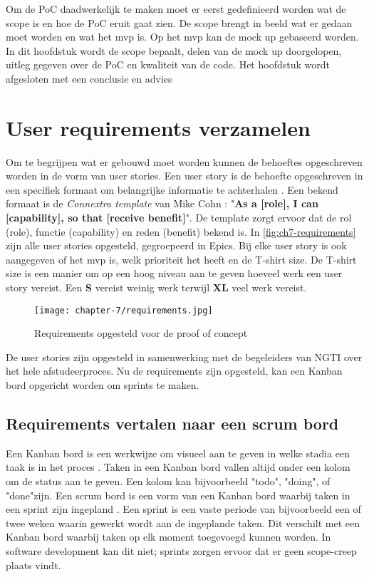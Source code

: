 Om de PoC daadwerkelijk te maken moet er eerst gedefinieerd worden wat de scope is en hoe de PoC eruit gaat zien. De scope brengt in beeld wat er gedaan moet worden en wat het \acrfull{mvp} is. Op het \acrshort{mvp} kan de mock up gebaseerd worden. In dit hoofdstuk wordt de scope bepaalt, delen van de mock up doorgelopen, uitleg gegeven over de PoC en kwaliteit van de code. Het hoofdstuk wordt afgesloten met een conclusie en advies

\section{User requirements verzamelen}\label{sec:ch7-user-requirements-verzamelen}
Om te begrijpen wat er gebouwd moet worden kunnen de behoeftes opgeschreven worden in de vorm van user stories. Een user story is de behoefte opgeschreven in een specifiek formaat om belangrijke informatie te achterhalen \cite{agile-user-story-template}. Een bekend formaat is de \textit{Connextra template} van Mike Cohn \cite{agile-user-story-template}: "\textbf{As a [role], I can [capability], so that [receive benefit]}". De template zorgt ervoor dat de rol (role), functie (capability) en reden (benefit) bekend is. In \autoref{fig:ch7-requirements} zijn alle user stories opgesteld, gegroepeerd in Epics. Bij elke user story is ook aangegeven of het \acrshort{mvp} is, welk prioriteit het heeft en de T-shirt size. De T-shirt size is een manier om op een hoog niveau aan te geven hoeveel werk een user story vereist. Een \textbf{S} vereist weinig werk terwijl \textbf{XL} veel werk vereist.

\begin{figure}[hbt!]
  \centering
  \texttt{[image: chapter-7/requirements.jpg]}
  \caption{Requirements opgesteld voor de proof of concept}
  \label{fig:ch7-requirements}
\end{figure}

De user stories zijn opgesteld in samenwerking met de begeleiders van NGTI over het hele afstudeerproces. Nu de requirements zijn opgesteld, kan een Kanban bord opgericht worden om sprints te maken.

\newpage

\subsection{Requirements vertalen naar een scrum bord}\label{subsec:ch7-requirements-vertalen-naar-een-scrum-bord}
Een Kanban bord is een werkwijze om visueel aan te geven in welke stadia een taak is in het proces \cite{atlassian-kanban-board}. Taken in een Kanban bord vallen altijd onder een kolom om de status aan te geven. Een kolom kan bijvoorbeeld "todo", "doing", of "done"\space zijn. Een scrum bord is een vorm van een Kanban bord waarbij taken in een sprint zijn ingepland \cite{forecast-scrum-board}. Een sprint is een vaste periode van bijvoorbeeld een of twee weken waarin gewerkt wordt aan de ingeplande taken. Dit verschilt met een Kanban bord waarbij taken op elk moment toegevoegd kunnen worden. In software development kan dit niet; sprints zorgen ervoor dat er geen \gls{scope-creep} plaats vindt.

